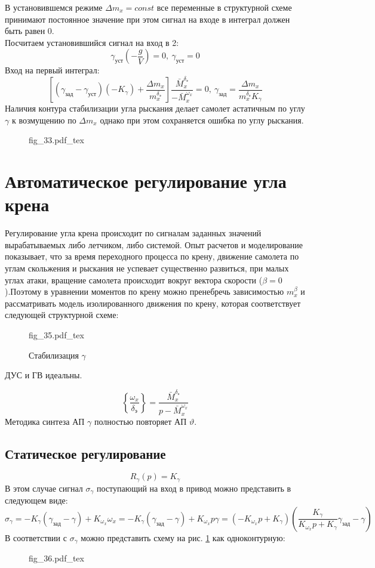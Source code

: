 \documentclass{article}
\begin{document}
В установившемся режиме $\Delta m_x = const$ все переменные в структурной схеме принимают постоянное значение при этом сигнал на входе в интеграл должен быть равен 0.\\
Посчитаем установившийся сигнал на вход в 2:
\[
	\gamma_\text{уст}(-\frac{g}{V}) = 0,\ \gamma_\text{уст} = 0 
\]
Вход на первый интеграл:
\[
	\left[(\gamma_\text{зад} - \gamma_\text{уст})(-K_\gamma)+\frac{\Delta m_x}{m_x^{\delta_\text{э}}}\right]\frac{\bar{M}_x^{\delta_\text{э}}}{-\bar{M}_x^{\omega_x}}= 0,\ \gamma_\text{зад}=\frac{\Delta m_x}{m_x^{\delta_\text{э}}K_{\gamma}} 
\]
Наличия контура стабилизации угла рыскания делает самолет астатичным по углу $\gamma$ к возмущению по $\Delta m_x$ однако при этом сохраняется ошибка по углу рыскания.

\begin{figure}[H]
	\centering
	{fig_33.pdf_tex}
\end{figure}

\section{Автоматическое регулирование угла крена}
Регулирование угла крена происходит по сигналам заданных значений вырабатываемых либо летчиком, либо системой. Опыт расчетов и моделирование показывает, что за время переходного процесса по крену, движение самолета по углам скольжения и рыскания не успевает существенно развиться, при малых углах атаки, вращение самолета происходит вокруг вектора скорости ($\beta = 0$).Поэтому в уравнении моментов по крену можно пренебречь зависимостью $m_x^\beta$ и рассматривать модель изолированного движения по крену, которая соответствует следующей структурной схеме:

\begin{figure}[H]
	\centering
	{fig_35.pdf_tex}
	\caption{Стабилизация $\gamma$}
	\label{fig:stab_gamma}
\end{figure}
ДУС и ГВ идеальны.

\[
	\left\{\frac{\omega_x}{\delta_\text{э}} \right\} =\frac{\bar{M}_x^{\delta_\text{э}}}{ p - \bar{M}_x^{\omega_x}} 
\]
Методика синтеза АП $\gamma$ полностью повторяет АП $\vartheta$.

\subsection{Статическое регулирование}
\[
    R_\gamma(p) = K_\gamma
\]
В этом случае сигнал $\sigma_\gamma$ поступающий на вход в привод можно представить в следующем виде: 
\[
	\sigma_\gamma =  - K_\gamma(\gamma_\text{зад} - \gamma) + K_{\omega_x} \omega_x = - K_{\gamma} (\gamma_\text{зад} - \gamma) + K_{\omega_x} p \gamma = (-K_{\omega_x} p + K_\gamma) \left(\frac{K_\gamma}{K_{\omega_x}p + K_\gamma} \gamma_\text{зад} - \gamma \right)
\]
В соответствии с $\sigma_\gamma$ можно представить схему на рис. \ref{fig:stab_gamma} как одноконтурную:
\begin{figure}[H]
	\centering
	{fig_36.pdf_tex}
\end{figure}
\end{document}
